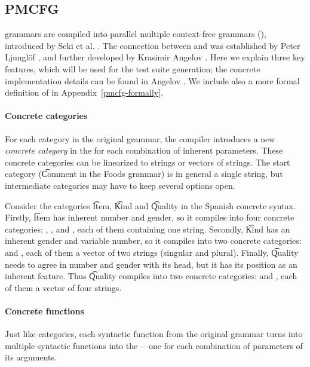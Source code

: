 \subsection{PMCFG}
\label{sec:PMCFG}

\gf{} grammars are compiled into parallel multiple context-free
grammars (\pmcfg), introduced by Seki et al. \cite{seki91pmcfg}. The
connection between \gf{} and \pmcfg{} was established by Peter
Ljunglöf \cite{ljunglof2004}, and further developed by Krasimir
Angelov \cite{angelov2010phd}.  Here we explain three key features,
which will be used for the test suite generation; the concrete
implementation details can be found in Angelov
\cite{angelov2010phd}. We include also a more formal definition of
\pmcfg{} in Appendix~\ref{pmcfg-formally}.

\paragraph{Concrete categories}

For each category in the original grammar, the \gf{} compiler
introduces a new \emph{concrete category} in the \pmcfg{} for each combination of
inherent parameters.  
These concrete categories can be linearized to strings or vectors of
strings. The start category (\t{Comment} in the Foods grammar) is in
general a single string, but intermediate categories may have to keep
several options open. 

Consider the categories \t{Item}, \t{Kind} and \t{Quality} in the
Spanish concrete syntax. Firstly, \t{Item} has inherent number
and gender, so it compiles into four concrete categories:
, ,  and
, each of them containing one string. Secondly,
\t{Kind} has an inherent gender and variable number, so it compiles into
two concrete categories:  and , each of them a
vector of two strings (singular and plural). Finally, \t{Quality} needs to
agree in number and gender with its head, but it has its position as
an inherent feature.  Thus \t{Quality} compiles into two concrete
categories:  and , each of them a vector of
four strings.

\paragraph{Concrete functions}
Just like categories, each syntactic function from the original
grammar turns into multiple syntactic functions into the
\pmcfg{}---one for each combination of parameters of its arguments.

